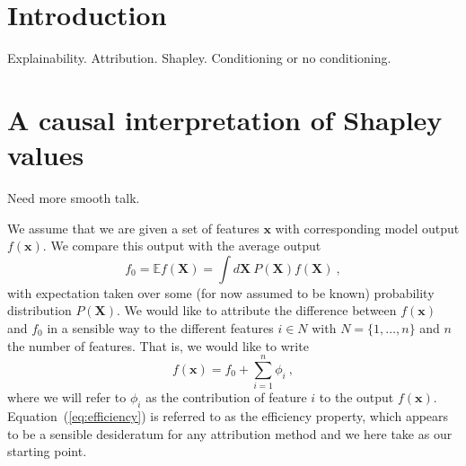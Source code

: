 \documentclass{article}
\newcommand{\vX}{\mathbf{X}}
\newcommand{\vx}{\mathbf{x}}
\newcommand{\expectation}{\mathbb{E}}
\newcommand{\contribution}{{\phi}}
\newcommand{\allfeatures}{{N}}
\newcommand{\comment}[1]{{\color{red} #1}}
\begin{document}

%


\section{Introduction}

Explainability. Attribution. Shapley. Conditioning or no conditioning.

\section{A causal interpretation of Shapley values}

\comment{Need more smooth talk.}

We assume that we are given a set of features $\vx$ with corresponding model output $f(\vx)$. We compare this output with the average output
\[
f_0 = \expectation f(\vX) = \int d\vX \: P(\vX) f(\vX) \: ,
\]
with expectation taken over some (for now assumed to be known) probability distribution $P(\vX)$. We would like to attribute the difference between $f(\vx)$ and $f_0$ in a sensible way to the different features $i \in \allfeatures$ with $\allfeatures = \{1,\ldots,n\}$ and $n$ the number of features. That is, we would like to write
\begin{equation}
f(\vx) = f_0 + \sum_{i=1}^n \contribution_i \: ,
\label{eq:efficiency}
\end{equation}
where we will refer to $\contribution_i$ as the contribution of feature $i$ to the output $f(\vx)$. Equation~(\ref{eq:efficiency}) is referred to as the efficiency property, which appears to be a sensible desideratum for any attribution method and we here take as our starting point.
\end{document}
